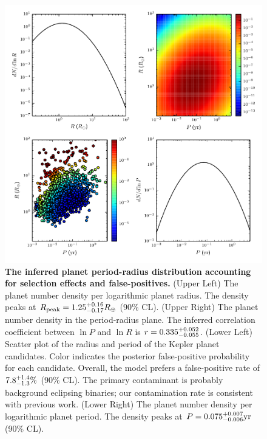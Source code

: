 \documentclass{nature}
\newcommand{\Rpeak}{R_\mathrm{peak}}
\newcommand{\REarth}{R_\oplus}
\begin{document}
\begin{figure}
  \includegraphics[width=\columnwidth]{foreground-dist}
  \caption{\label{fig:foreground-dist} \textbf{The inferred planet
      period-radius distribution accounting for selection effects and
      false-positives.}  (Upper Left) The planet number density per
    logarithmic planet radius.  The density peaks at $\Rpeak =
    \rpeakrange \REarth$ (90\% CL).  (Upper Right) The planet
    number density in the period-radius plane.  The inferred
    correlation coefficient between $\ln P$ and $\ln R$ is $r =
    0.335_{-0.055}^{+0.052}$.  (Lower Left) Scatter plot of the radius
    and period of the Kepler planet candidates.  Color indicates the
    posterior false-positive probability for each candidate.  Overall,
    the model prefers a false-positive rate of $7.8_{-1.3}^{+1.4}\%$
    (90\% CL).  The primary contaminant is probably background
    eclipsing binaries; our contamination rate is consistent with
    previous work\cite{2013ApJ...766...81F}. (Lower Right) The planet
    number density per logarithmic planet period.  The density peaks
    at $P = 0.075_{-0.006}^{+0.007} \mathrm{yr}$ (90\% CL).}
\end{figure}
\end{document}
